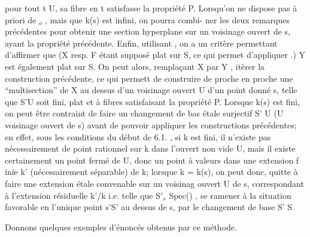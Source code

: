 pour tout t \hand{$\in$}U,  sa fibre  en  t satisfasse la propriété P.  Lorsqu'on ne
dispose pas à priori de \hand{$\xi$}$_{o}$ ,  mais que k(s) est infini, on pourra combi-%
ner les deux remarques précédentes pour obtenir une section hyperplane
sur un voisinage ouvert de s, ayant la propriété précédente.  Enfin,
utilisant  , on a un critère permettant d'affirmer que (X resp. F étant
supposé plat sur S, ce qui permet d'appliquer .)  Y\hand{$_{\xi}$}  est également
plat sur S. On peut alors, remplaçant X par Y\hand{$_{\xi}$} , itèrer la construction
précédente, ce qui permett  de construire de proche en proche une
``multisection''  de X au dessus d'un voisinage ouvert U d'un point donné s,
telle que S'\hand{$\longrightarrow$}U soit fini, plat et à fibres satisfaisant la propriété P.
Lorsque k(s) est fini, on peut être contraint de faire un changement de bas%
étale surjectif S'\hand{$\longrightarrow$} U (U voisinage ouvert de s) avant de pouvoir appliquer
les constructions précédentes; en effet, sous les conditions du début de
6.1. , si k est fini, il n'existe pas nécessairement de point rationnel sur
k dans  l'ouvert non vide U, mais 
il existe certainement un point fermé de U, donc un point à valeurs dans
une extension f inie k' (nécessairement séparable) de k; lorsque k = k(s),
on peut donc, quitte à faire une extension  étale convenable  sur un voisinag%
ouvert U de  s, correspondant à l'extension résiduelle k'/k
i.e. telle que  S$'_{s}$ \hand{$\xrightarrow{\sim}$}Spec() , se ramener à la situation favorable 
en l'unique point s'\hand{$\in$}S' au dessus de s, par le changement de base S'\hand{$\to$} S.

Donnons quelques exemples d'énoncés obtenus par ce méthode. 
%
%
%
%
